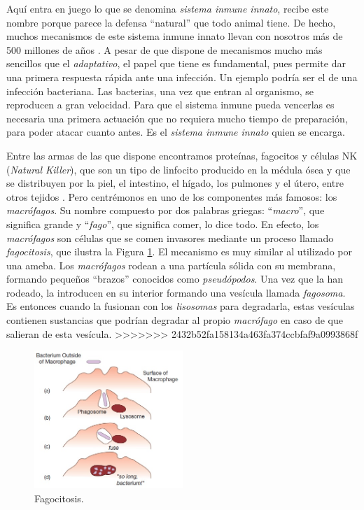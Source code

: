 Aquí entra en juego lo que se denomina \textit{sistema inmune innato}, recibe este nombre porque parece la defensa ``natural'' que todo animal tiene. De hecho, muchos mecanismos de este sistema inmune innato llevan con nosotros más de 500 millones de años \citep{theHowItWorks}. A pesar de que dispone de mecanismos mucho más sencillos que el \textit{adaptativo}, el papel que tiene es fundamental, pues permite dar una primera respuesta rápida ante una infección. Un ejemplo podría ser el de una infección bacteriana. Las bacterias, una vez que entran al organismo, se reproducen a gran velocidad. Para que el sistema inmune pueda vencerlas es necesaria una primera actuación que no requiera mucho tiempo de preparación, para poder atacar cuanto antes. Es el \textit{sistema inmune innato} quien se encarga. 

Entre las armas de las que dispone encontramos proteínas, fagocitos y células NK (\textit{Natural Killer}), que son un tipo de linfocito producido en la médula ósea y que se distribuyen por la piel, el intestino, el hígado, los pulmones y el útero, entre otros tejidos \citep{celulasNK}. Pero centrémonos en uno de los componentes más famosos: los \textit{macrófagos}. Su nombre compuesto por dos palabras griegas: ``\textit{macro}'', que significa grande y ``\textit{fago}'', que significa comer, lo dice todo. En efecto, los \textit{macrófagos} son células que se comen invasores mediante un proceso llamado \textit{fagocitosis}, que ilustra la Figura \ref{fig:macrofago}. El mecanismo es muy similar al utilizado por una ameba. Los \textit{macrófagos} rodean a una partícula sólida con su membrana, formando pequeños ``brazos'' conocidos como \textit{pseudópodos}. Una vez que la han rodeado, la introducen en su interior formando una vesícula llamada \textit{fagosoma}. Es entonces cuando la fusionan con los \textit{lisosomas} para degradarla, estas vesículas contienen sustancias que podrían degradar al propio \textit{macrófago} en caso de que salieran de esta vesícula.
>>>>>>> 2432b52fa158134a463fa374ccbfaf9a0993868f


\begin{figure}[t]
	\centering
	\includegraphics[width=0.5\textwidth]{1_macrofago}
	\caption{Fagocitosis.}
	\label{fig:macrofago}
\end{figure}


